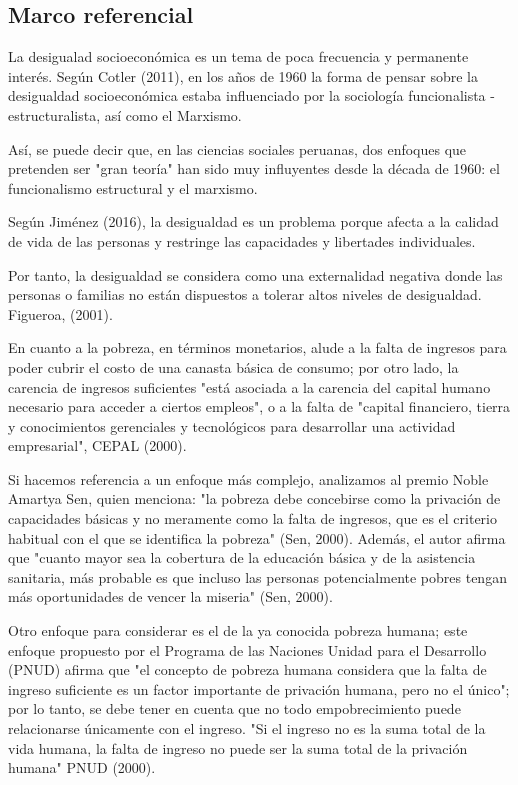 \subsection{Marco referencial}
	
La desigualad socioeconómica es un tema de poca frecuencia y permanente interés. Según Cotler (2011), en los años de 1960 la forma de pensar sobre la desigualdad socioeconómica estaba influenciado por la sociología funcionalista - estructuralista, así como el Marxismo. 

Así, se puede decir que, en las ciencias sociales peruanas, dos enfoques que pretenden ser "gran teoría" han sido muy influyentes desde la década de 1960: el funcionalismo estructural y el marxismo.

Según Jiménez (2016), la desigualdad es un problema porque afecta a la calidad de vida de las personas y restringe las capacidades y libertades individuales.

Por tanto, la desigualdad se considera como una externalidad negativa donde las personas o familias no están dispuestos a tolerar altos niveles de desigualdad. Figueroa, (2001).

En cuanto a la pobreza, en términos monetarios, alude a la falta de ingresos para poder cubrir el costo de una canasta básica de consumo; por otro lado, la carencia de ingresos suficientes "está asociada a la carencia del capital humano necesario para acceder a ciertos empleos", o a la falta de "capital financiero, tierra y conocimientos gerenciales y tecnológicos para desarrollar una actividad empresarial", CEPAL (2000).

Si hacemos referencia a un enfoque más complejo, analizamos al premio Noble Amartya Sen, quien menciona: "la pobreza debe concebirse como la privación de capacidades básicas y no meramente como la falta de ingresos, que es el criterio habitual con el que se identifica la pobreza" (Sen, 2000).  Además, el autor afirma que "cuanto mayor sea la cobertura de la educación básica y de la asistencia sanitaria, más probable es que incluso las personas potencialmente pobres tengan más oportunidades de vencer la miseria" (Sen, 2000).

Otro enfoque para considerar es el de la ya conocida pobreza humana; este enfoque propuesto por el Programa de las Naciones Unidad para el Desarrollo (PNUD) afirma que "el concepto de pobreza humana considera que la falta de ingreso suficiente es un factor importante de privación humana, pero no el único"; por lo tanto, se debe tener en cuenta que no todo empobrecimiento puede relacionarse únicamente con el ingreso. "Si el ingreso no es la suma total de la vida humana, la falta de ingreso no puede ser la suma total de la privación humana" PNUD (2000).

